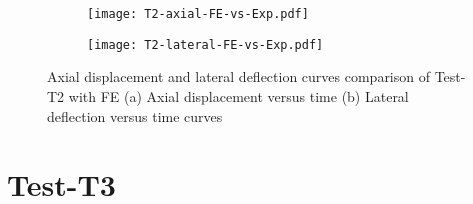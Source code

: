 \begin{figure}[!htbp]
	\centering
	\begin{subfigure}[b]{0.45\textwidth}
		\centering
		\texttt{[image: T2-axial-FE-vs-Exp.pdf]}
		\caption{}
		\label{subfig:T2-axial-FE-vs-Exp}
	\end{subfigure}
	\begin{subfigure}[b]{0.45\textwidth}
		\centering
		\texttt{[image: T2-lateral-FE-vs-Exp.pdf]}
		\caption{}
		\label{subfig:T2-lateral-FE-vs-Exp}
	\end{subfigure}
	   \caption{Axial displacement and lateral deflection curves comparison of Test-T2 with FE (a) Axial displacement versus time (b) Lateral deflection versus time curves}
	   \label{fig:T2-structural-FE-vs-Exp}
\end{figure} 

\section*{Test-T3}

